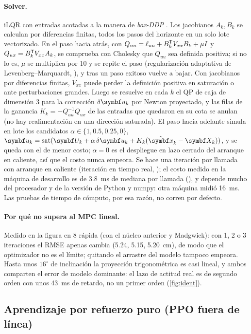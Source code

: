 \paragraph{Solver.} iLQR \cite{li04,tassa12} con entradas acotadas a la
manera de \emph{box-DDP} \cite{tassa14}. Los jacobianos $A_k,B_k$ se calculan
por diferencias finitas, todos los pasos del horizonte en un solo lote
vectorizado. En el paso hacia atrás, con
$Q_{uu}=\ell_{uu}+B_k^{\mathsf{T}} V_{xx}B_k+\mu I$ y $Q_{ux}=B_k^{\mathsf{T}} V_{xx}A_k$, se
comprueba con Cholesky que $Q_{uu}$ sea definida positiva; si no lo es,
$\mu$ se multiplica por 10 y se repite el paso (regularización adaptativa de
Levenberg--Marquardt, \cite{tassa12}), y tras un paso exitoso vuelve a bajar.
Con jacobianos por diferencias finitas, $V_{xx}$ puede perder la definición
positiva en saturación o ante perturbaciones grandes. Luego se
resuelve en cada $k$ el QP de caja de dimensión 3 para la corrección
$\delta\vect u_k$ por Newton proyectado, y las filas de la ganancia
$K_k=-Q_{uu}^{-1}Q_{ux}$ de las entradas que quedaron en su cota se anulan
(no hay realimentación en una dirección saturada). El paso hacia adelante
simula en lote los candidatos $\alpha\in\{1,0.5,0.25,0\}$,
$\vect u_k=\sat(\vect U_k+\alpha\,\delta\vect u_k+K_k(\hat{\vect x}_k-\vect X_k))$, y
se queda con el de menor costo; $\alpha=0$ es el despliegue en lazo cerrado
del arranque en caliente, así que el costo nunca empeora. Se hace una
iteración por llamada con arranque en caliente (iteración en tiempo real,
\cite{diehl05}); el costo medido en la máquina de desarrollo es de
3.8~ms de mediana por llamada
(), y depende mucho del procesador y de la
versión de Python y numpy: otra máquina midió 16~ms. Las pruebas de tiempo
de cómputo, por esa razón, no corren por defecto.

\paragraph{Por qué no supera al MPC lineal.} Medido en la figura en 8
rápida (con el núcleo anterior y Madgwick): con 1, 2 o 3 iteraciones el RMSE apenas cambia (5.24, 5.15,
5.20~cm), de modo que el optimizador no es el límite; quitando el arrastre
del modelo tampoco empeora. Hasta unos $16^\circ$ de inclinación la
proyección trigonométrica es casi lineal, y ambos comparten el error de
modelo dominante: el lazo de actitud real es de segundo orden con unos
43~ms de retardo, no un primer orden (\cref{fig:ident}).

\subsection{Aprendizaje por refuerzo puro (PPO fuera de línea)}

